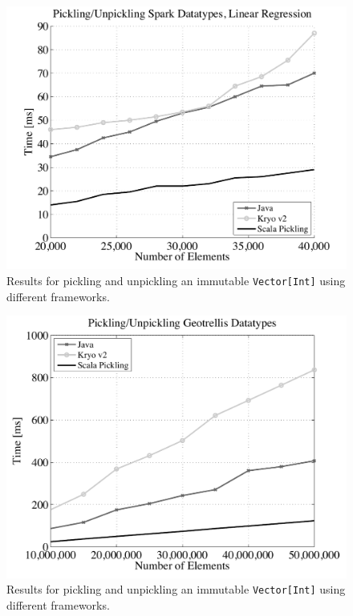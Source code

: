 \documentclass[preprint,10pt]{sigplanconf}
\theoremstyle{definition}
\theoremstyle{definition}
\begin{document}
\begin{figure}[ht!]
 \centering
 \includegraphics[width=\columnwidth]{sparklr.pdf}
 \caption{Results for pickling and unpickling an immutable
   \texttt{Vector[Int]} using different frameworks.}
 \label{fig:spark}
\end{figure}

\begin{figure}[ht!]
 \centering
 \includegraphics[width=\columnwidth]{geotrellis.pdf}
 \caption{Results for pickling and unpickling an immutable
   \texttt{Vector[Int]} using different frameworks.}
 \label{fig:geotrellis}
\end{figure}
\end{document}

